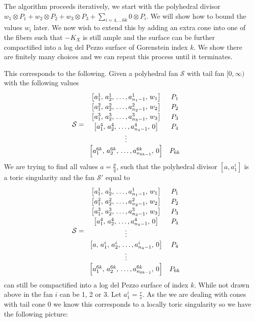 \documentclass[12pt,a4paper]{book}      %
\begin{document}
\begin{algorithm}

The algorithm proceeds iteratively, we start with the polyhedral divisor $w_1 \otimes P_1 + w_2 \otimes P_2 + w_3 \otimes P_3 + \sum_{i = 4, \dots 6k} 0 \otimes P_i$. We will show how to bound the values $w_i$ later. We now wish to extend this by adding an extra cone into one of the fibers such that $-K_X$ is still ample and the surface can be further compactified into a log del Pezzo surface of Gorenstein index $k$. We show there are finitely many choices and we can repeat this process until it terminates.

This corresponds to the following. Given a polyhedral fan $\mathcal{S}$ with tail fan $[0, \infty)$ with the following values
\[\def\arraystretch{1.2}
\mathcal{S} = 
\begin{array}{cc}
\left[ a_1^1,\,  a_2^1, \, \dots, a_{n_1 - 1}^1, \, w_1 \right] & P_1 \\
\left[a_1^2, \, a_2^2,\,  \dots, a_{n_2 - 1}^2, \, w_2 \right] & P_2 \\
\left[a_1^3, \, a_2^3,\,  \dots, a_{n_3 - 1}^3, \, w_3 \right] & P_3 \\
\left[a_1^4, \, a_2^4,\,  \dots, a_{n_4 - 1}^4, \, 0 \right] & P_4 \\
\vdots \\
\left[ a_1^{6k}, \, a_2^{6k}, \,  \dots, a_{n_{6k-1}}^{6k}, \, 0 \right] & P_{6k} \\
\end{array}
\]
We are trying to find all values $a = \frac{p}{q}$, such that the polyhedral divisor $[a, a_1^i]$ is a toric singularity and the fan $\mathcal{S}'$ equal to
\[\def\arraystretch{1.2}
\mathcal{S} = 
\begin{array}{cc}
\left[ a_1^1,\,  a_2^1, \, \dots, a_{n_1 - 1}^1, \, w_1 \right] & P_1 \\
\left[a_1^2, \, a_2^2,\,  \dots, a_{n_2 - 1}^2, \, w_2 \right] & P_2 \\
\left[a_1^3, \, a_2^3,\,  \dots, a_{n_3 - 1}^3, \, w_3 \right] & P_3 \\
\left[a_1^4, \, a_2^4,\,  \dots, a_{n_4 - 1}^4, \, 0 \right] & P_4 \\
\vdots \\
\left[a, \, a_1^i, \, a_2^i,\,  \dots, a_{n_4 - 1}^i, \, 0 \right] & P_4 \\
\vdots \\
\left[ a_1^{6k}, \, a_2^{6k}, \,  \dots, a_{n_{6k-1}}^{6k}, \, 0 \right] & P_{6k} \\
\end{array}
\]
can still be compactified into a log del Pezzo surface of index $k$. While not drawn above in the fan $i$ can be 1, 2 or 3. Let $a_1^i = \frac{r}{s}$. As the we are dealing with cones with tail cone $0$ we know this corresponds to a locally toric singularity so we have the following picture:


\end{algorithm}
\end{document}
